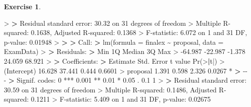 \documentclass[
]{book}
\newenvironment{Shaded}{\begin{snugshade}}{\end{snugshade}}
\newcommand{\AttributeTok}[1]{\textcolor[rgb]{0.77,0.63,0.00}{#1}}
\newcommand{\DecValTok}[1]{\textcolor[rgb]{0.00,0.00,0.81}{#1}}
\newcommand{\ErrorTok}[1]{\textcolor[rgb]{0.64,0.00,0.00}{\textbf{#1}}}
\newcommand{\FloatTok}[1]{\textcolor[rgb]{0.00,0.00,0.81}{#1}}
\newcommand{\FunctionTok}[1]{\textcolor[rgb]{0.00,0.00,0.00}{#1}}
\newcommand{\NormalTok}[1]{#1}
\newcommand{\SpecialCharTok}[1]{\textcolor[rgb]{0.00,0.00,0.00}{#1}}
\newcommand{\StringTok}[1]{\textcolor[rgb]{0.31,0.60,0.02}{#1}}
\theoremstyle{definition}
\theoremstyle{definition}
\theoremstyle{definition}
\newtheorem{exercise}{Exercise}[chapter]
\theoremstyle{definition}
\theoremstyle{remark}
\begin{document}
\begin{exercise}
\begin{Shaded}
\begin{Highlighting}[]
\SpecialCharTok{\textgreater{}} 
\ErrorTok{\textgreater{}}\NormalTok{ Residual standard error}\SpecialCharTok{:} \FloatTok{30.32}\NormalTok{ on }\DecValTok{31}\NormalTok{ degrees of freedom}
\SpecialCharTok{\textgreater{}}\NormalTok{ Multiple R}\SpecialCharTok{{-}}\NormalTok{squared}\SpecialCharTok{:}  \FloatTok{0.1638}\NormalTok{,  Adjusted R}\SpecialCharTok{{-}}\NormalTok{squared}\SpecialCharTok{:}  \FloatTok{0.1368} 
\SpecialCharTok{\textgreater{}}\NormalTok{ F}\SpecialCharTok{{-}}\NormalTok{statistic}\SpecialCharTok{:} \FloatTok{6.072}\NormalTok{ on }\DecValTok{1}\NormalTok{ and }\DecValTok{31}\NormalTok{ DF,  p}\SpecialCharTok{{-}}\NormalTok{value}\SpecialCharTok{:} \FloatTok{0.01948}
\SpecialCharTok{\textgreater{}} 
\ErrorTok{\textgreater{}} 
\ErrorTok{\textgreater{}}\NormalTok{ Call}\SpecialCharTok{:}
\ErrorTok{\textgreater{}} \FunctionTok{lm}\NormalTok{(}\AttributeTok{formula =}\NormalTok{ finalex }\SpecialCharTok{\textasciitilde{}}\NormalTok{ proposal, }\AttributeTok{data =}\NormalTok{ ExamData)}
\SpecialCharTok{\textgreater{}} 
\ErrorTok{\textgreater{}}\NormalTok{ Residuals}\SpecialCharTok{:}
\ErrorTok{\textgreater{}}\NormalTok{     Min      1Q  Median      3Q     Max }
\SpecialCharTok{\textgreater{}} \SpecialCharTok{{-}}\FloatTok{64.987} \SpecialCharTok{{-}}\FloatTok{22.987}  \SpecialCharTok{{-}}\FloatTok{1.378}  \FloatTok{24.059}  \FloatTok{68.921} 
\SpecialCharTok{\textgreater{}} 
\ErrorTok{\textgreater{}}\NormalTok{ Coefficients}\SpecialCharTok{:}
\ErrorTok{\textgreater{}}\NormalTok{             Estimate Std. Error t value }\FunctionTok{Pr}\NormalTok{(}\SpecialCharTok{\textgreater{}}\ErrorTok{|}\NormalTok{t}\SpecialCharTok{|}\NormalTok{)  }
\SpecialCharTok{\textgreater{}}\NormalTok{ (Intercept)   }\FloatTok{16.628}     \FloatTok{37.441}   \FloatTok{0.444}   \FloatTok{0.6601}  
\SpecialCharTok{\textgreater{}}\NormalTok{ proposal       }\FloatTok{1.391}      \FloatTok{0.598}   \FloatTok{2.326}   \FloatTok{0.0267} \SpecialCharTok{*}
\ErrorTok{\textgreater{}} \SpecialCharTok{{-}{-}{-}}
\ErrorTok{\textgreater{}}\NormalTok{ Signif. codes}\SpecialCharTok{:}  \DecValTok{0} \StringTok{\textquotesingle{}***\textquotesingle{}} \FloatTok{0.001} \StringTok{\textquotesingle{}**\textquotesingle{}} \FloatTok{0.01} \StringTok{\textquotesingle{}*\textquotesingle{}} \FloatTok{0.05} \StringTok{\textquotesingle{}.\textquotesingle{}} \FloatTok{0.1} \StringTok{\textquotesingle{} \textquotesingle{}} \DecValTok{1}
\SpecialCharTok{\textgreater{}} 
\ErrorTok{\textgreater{}}\NormalTok{ Residual standard error}\SpecialCharTok{:} \FloatTok{30.59}\NormalTok{ on }\DecValTok{31}\NormalTok{ degrees of freedom}
\SpecialCharTok{\textgreater{}}\NormalTok{ Multiple R}\SpecialCharTok{{-}}\NormalTok{squared}\SpecialCharTok{:}  \FloatTok{0.1486}\NormalTok{,  Adjusted R}\SpecialCharTok{{-}}\NormalTok{squared}\SpecialCharTok{:}  \FloatTok{0.1211} 
\SpecialCharTok{\textgreater{}}\NormalTok{ F}\SpecialCharTok{{-}}\NormalTok{statistic}\SpecialCharTok{:} \FloatTok{5.409}\NormalTok{ on }\DecValTok{1}\NormalTok{ and }\DecValTok{31}\NormalTok{ DF,  p}\SpecialCharTok{{-}}\NormalTok{value}\SpecialCharTok{:} \FloatTok{0.02675}
\end{Highlighting}
\end{Shaded}


\end{exercise}
\end{document}
